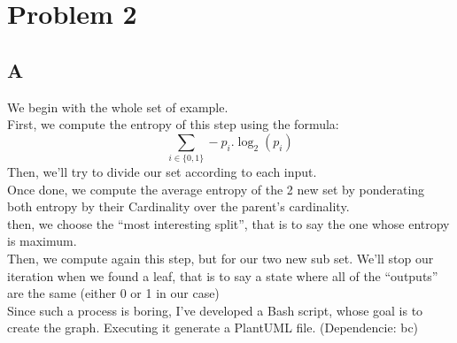 \documentclass{article}
\begin{document}
    \section{Problem 2}
        \subsection{A}
            We begin with the whole set of example.\\
            First, we compute the entropy of this step using the formula:
            \[
                \sum_{i\in\{0, 1\}} -p_i.\log_2(p_i)
            \]
            Then, we'll try to divide our set according to each input.\\
            Once done, we compute the average entropy of the 2 new set by ponderating both entropy by their Cardinality over the parent's cardinality.\\
            then, we choose the ``most interesting split'', that is to say the one whose entropy is maximum.\\

            Then, we compute again this step, but for our two new sub set. We'll stop our iteration when we found a leaf, that is to say a state where all of the ``outputs'' are the same (either 0 or 1 in our case)\\
            Since such a process is boring, I've developed a Bash script, whose goal is to create the graph. Executing it generate a PlantUML file. (Dependencie: bc)\\
\end{document}

